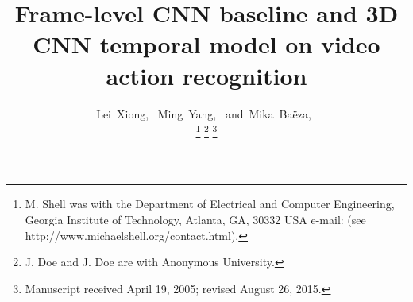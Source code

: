 \documentclass[journal]{IEEEtran}
\begin{document}
%
\title{Frame-level CNN baseline and 3D CNN temporal model on video action recognition}
%
%
%

\author{Lei~Xiong,~
        Ming~Yang,~
        and~Mika~Baëza,~%

\thanks{M. Shell was with the Department
of Electrical and Computer Engineering, Georgia Institute of Technology, Atlanta,
GA, 30332 USA e-mail: (see http://www.michaelshell.org/contact.html).}%
\thanks{J. Doe and J. Doe are with Anonymous University.}%
\thanks{Manuscript received April 19, 2005; revised August 26, 2015.}}

% 
%
\end{document}
